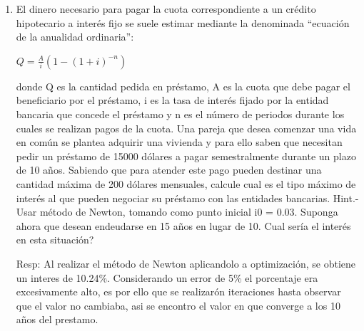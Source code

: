 \documentclass{udparticle}
\begin{document}
\begin{enumerate}
\newpage
\item El dinero necesario para pagar la cuota correspondiente a un crédito hipotecario a interés fijo se suele
estimar mediante la denominada “ecuación de la anualidad ordinaria”:
\begin{center}
    $ Q = \frac{A}{i}(1-(1+i)^{-n}) $
\end{center}
donde Q es la cantidad pedida en préstamo, A es la cuota que debe pagar el beneficiario por el
préstamo, i es la tasa de interés fijado por la entidad bancaria que concede el préstamo y n es el
número de periodos durante los cuales se realizan pagos de la cuota.
Una pareja que desea comenzar una vida en común se plantea adquirir una vivienda y para ello saben
que necesitan pedir un préstamo de 15000 dólares a pagar semestralmente durante un plazo de 10 años.
Sabiendo que para atender este pago pueden destinar una cantidad máxima de 200 dólares mensuales,
calcule cual es el tipo máximo de interés al que pueden negociar su préstamo con las entidades bancarias.
Hint.- Usar método de Newton, tomando como punto inicial i0 = 0.03.
Suponga ahora que desean endeudarse en 15 años en lugar de 10. Cual sería el interés en esta situación?


Resp: Al realizar el método de Newton aplicandolo a optimización, se obtiene un interes de 10.24\%. Considerando un error de 5\% el porcentaje era excesivamente alto, es por ello que se realizarón iteraciones hasta observar que el valor no cambiaba, asi se encontro el valor en que converge a los 10 años del prestamo.


\end{enumerate}
\end{document}
